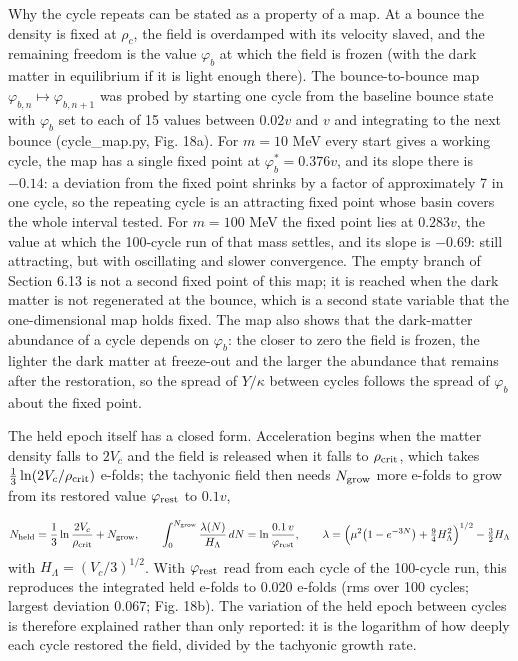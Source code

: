 \documentclass[11pt,a4paper]{article}
\begin{document}
Why the cycle repeats can be stated as a property of a map. At a bounce the density is fixed at $\rho_c$, the field is overdamped with its velocity slaved, and the remaining freedom is the value $\varphi_b$ at which the field is frozen (with the dark matter in equilibrium if it is light enough there). The bounce-to-bounce map $\varphi_{b,n}\mapsto\varphi_{b,n+1}$ was probed by starting one cycle from the baseline bounce state with $\varphi_b$ set to each of 15 values between $0.02v$ and $v$ and integrating to the next bounce (cycle\_map.py, Fig. 18a). For $m=10$ MeV every start gives a working cycle, the map has a single fixed point at $\varphi_b^*=0.376v$, and its slope there is $-0.14$: a deviation from the fixed point shrinks by a factor of approximately 7 in one cycle, so the repeating cycle is an attracting fixed point whose basin covers the whole interval tested. For $m=100$ MeV the fixed point lies at $0.283v$, the value at which the 100-cycle run of that mass settles, and its slope is $-0.69$: still attracting, but with oscillating and slower convergence. The empty branch of Section 6.13 is not a second fixed point of this map; it is reached when the dark matter is not regenerated at the bounce, which is a second state variable that the one-dimensional map holds fixed. The map also shows that the dark-matter abundance of a cycle depends on $\varphi_b$: the closer to zero the field is frozen, the lighter the dark matter at freeze-out and the larger the abundance that remains after the restoration, so the spread of $Y/\kappa$ between cycles follows the spread of $\varphi_b$ about the fixed point.

The held epoch itself has a closed form. Acceleration begins when the matter density falls to $2V_c$ and the field is released when it falls to $\rho_{\rm crit}$, which takes $\frac13\ln(2V_c/\rho_{\rm crit})$ e-folds; the tachyonic field then needs $N_{\rm grow}$ more e-folds to grow from its restored value $\varphi_{\rm rest}$ to $0.1v$,

\begin{equation}
N_{\rm held}=\frac{1}{3}\ln\frac{2V_c}{\rho_{\rm crit}}+N_{\rm grow},\qquad \int_0^{N_{\rm grow}}\frac{\lambda(N)}{H_\Lambda}\,dN=\ln\frac{0.1\,v}{\varphi_{\rm rest}},\qquad \lambda=\Big(\mu^2\big(1-e^{-3N}\big)+\tfrac94H_\Lambda^2\Big)^{1/2}-\tfrac32H_\Lambda
\end{equation}
with $H_\Lambda=(V_c/3)^{1/2}$. With $\varphi_{\rm rest}$ read from each cycle of the 100-cycle run, this reproduces the integrated held e-folds to 0.020 e-folds (rms over 100 cycles; largest deviation 0.067; Fig. 18b). The variation of the held epoch between cycles is therefore explained rather than only reported: it is the logarithm of how deeply each cycle restored the field, divided by the tachyonic growth rate.
\end{document}
